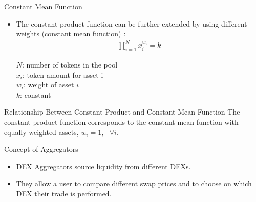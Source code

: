 \documentclass[]{beamer}
\begin{document}
\begin{frame}{Constant Mean Function}
\begin{itemize}
	\item The constant product function can be further extended by using different weights (constant mean function) \cite{BAL}:
		\begin{align*}
			\prod_{i=1}^N x_i^{w_i}= k
		\end{align*}

		$N$: number of tokens in the pool\\
		$x_i$: token amount for asset i\\
		$w_i$: weight of asset $i$\\
		$k$: constant
\end{itemize}

	\vspace{0.5cm}

	\begin{keytakeaway}{Relationship Between Constant Product and Constant Mean Function}
	The constant product function corresponds to the constant mean function with equally weighted assets, $w_i = 1, \text{ } \forall i$.
	\end{keytakeaway}

\end{frame}


\begin{frame}{Concept of Aggregators}
\begin{figure}
	\centering
	\resizebox{0.8\textwidth}{!}{
	\begin{tikzpicture}[scale=1.0, every node/.style={scale=1.0}]
			
	\end{tikzpicture}}
\end{figure}
	
\begin{itemize}
	\item DEX Aggregators source liquidity from different DEXs.
	\item They allow a user to compare different swap prices and to choose on which DEX their trade is performed.
\end{itemize}

\end{frame}
\end{document}
